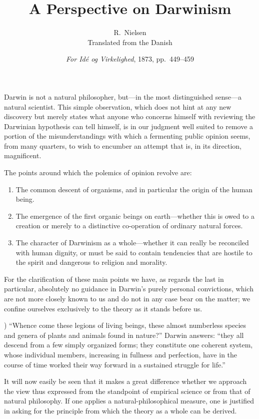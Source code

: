 \documentclass[12pt,a4paper]{article}
\title{\textbf{A Perspective on Darwinism}}
\author{R.\ Nielsen\\[4pt]
  \small Translated from the Danish}
\date{\emph{For Idé og Virkelighed}, 1873, pp.\ 449--459}
\begin{document}
\maketitle
\thispagestyle{fancy}

\bigskip

Darwin is not a natural philosopher, but---in the most distinguished
sense---a natural scientist. This simple observation, which does not
hint at any new discovery but merely states what anyone who concerns
himself with reviewing the Darwinian hypothesis can tell himself, is
in our judgment well suited to remove a portion of the
misunderstandings with which a fermenting public opinion seems, from
many quarters, to wish to encumber an attempt that is, in its
direction, magnificent.

The points around which the polemics of opinion revolve are:

\begin{enumerate}
  \item The common descent of organisms, and in particular the origin
        of the human being.
  \item The emergence of the first organic beings on earth---whether
        this is owed to a creation or merely to a distinctive
        co-operation of ordinary natural forces.
  \item The character of Darwinism as a whole---whether it can really
        be reconciled with human dignity, or must be said to contain
        tendencies that are hostile to the spirit and dangerous to
        religion and morality.
\end{enumerate}

For the clarification of these main points we have, as regards the
last in particular, absolutely no guidance in Darwin's purely personal
convictions, which are not more closely known to us and do not in any
case bear on the matter; we confine ourselves exclusively to the
theory as it stands before us.

\medskip

) ``Whence come these legions of living beings, these almost
numberless species and genera of plants and animals found in nature?''
Darwin answers: ``they all descend from a few simply organized forms;
they constitute one coherent system, whose individual members,
increasing in fullness and perfection, have in the course of time
worked their way forward in a sustained struggle for life.''

It will now easily be seen that it makes a great difference whether
we approach the view thus expressed from the standpoint of empirical
science or from that of natural philosophy. If one applies a
natural-philosophical measure, one is justified in asking for the
principle from which the theory as a whole can be derived.
\end{document}
